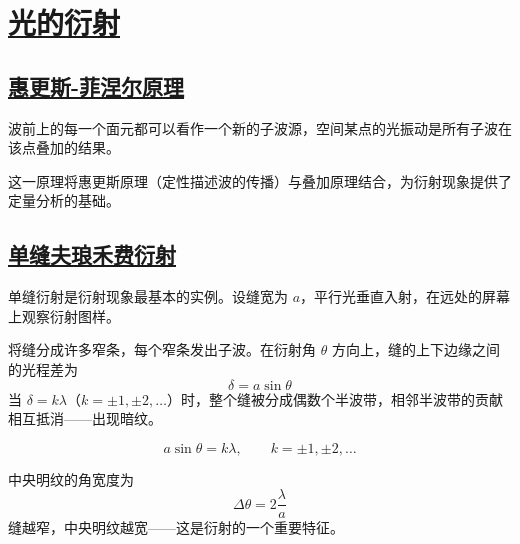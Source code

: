 \section{\protect\hyperlink{:}{光的衍射}}

\subsection{\protect\hyperlink{:}{惠更斯-菲涅尔原理}}

\begin{theorem}
    波前上的每一个面元都可以看作一个新的子波源，空间某点的光振动是所有子波在该点叠加的结果。
\end{theorem}

这一原理将惠更斯原理（定性描述波的传播）与叠加原理结合，为衍射现象提供了定量分析的基础。

\subsection{\protect\hyperlink{:}{单缝夫琅禾费衍射}}

单缝衍射是衍射现象最基本的实例。设缝宽为 $a$，平行光垂直入射，在远处的屏幕上观察衍射图样。

\begin{theorem}[半波带法分析]
    将缝分成许多窄条，每个窄条发出子波。在衍射角 $\theta$ 方向上，缝的上下边缘之间的光程差为
    \begin{equation}
        \delta = a\sin\theta
    \end{equation}
    当 $\delta = k\lambda$（$k = \pm1, \pm2, \ldots$）时，整个缝被分成偶数个半波带，相邻半波带的贡献相互抵消——出现暗纹。
\end{theorem}

\begin{theorem}[单缝衍射的暗纹条件]
    \begin{equation}
        a\sin\theta = k\lambda, \qquad k = \pm1, \pm2, \ldots
    \end{equation}
\end{theorem}

\begin{definition}[中央明纹]
    中央明纹的角宽度为
    \begin{equation}
        \Delta\theta = 2\frac{\lambda}{a}
    \end{equation}
    缝越窄，中央明纹越宽——这是衍射的一个重要特征。
\end{definition}

